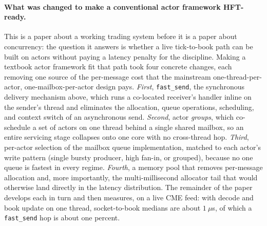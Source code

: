 \documentclass[11pt]{article}
\newcommand{\fs}{\texttt{fast\_send}}
\begin{document}
\paragraph{What was changed to make a conventional actor framework HFT-ready.}
This is a paper about a working trading system before it is a paper about
concurrency: the question it answers is whether a live tick-to-book path can be
built on actors without paying a latency penalty for the discipline. Making a
textbook actor framework fit that path took four concrete changes, each removing
one source of the per-message cost that the mainstream one-thread-per-actor,
one-mailbox-per-actor design pays. \emph{First}, \fs{}, the synchronous
delivery mechanism above, which runs a co-located receiver's handler inline on
the sender's thread and eliminates the allocation, queue operations, scheduling,
and context switch of an asynchronous send. \emph{Second}, actor \emph{groups},
which co-schedule a set of actors on one thread behind a single shared mailbox,
so an entire servicing stage collapses onto one core with no cross-thread hop.
\emph{Third}, per-actor selection of the mailbox queue implementation, matched to
each actor's write pattern (single bursty producer, high fan-in, or grouped),
because no one queue is fastest in every regime. \emph{Fourth}, a memory pool
that removes per-message allocation and, more importantly, the multi-millisecond
allocator tail that would otherwise land directly in the latency distribution.
The remainder of the paper develops each in turn and then measures, on a live CME
feed: with decode and book update on one thread, socket-to-book medians are about
$1~\mu$s, of which a \fs{} hop is about one percent.
\end{document}
